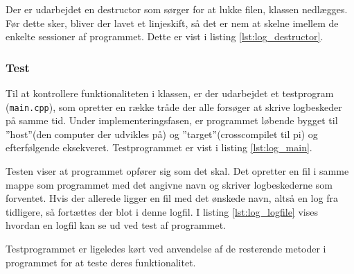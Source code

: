 

Der er udarbejdet en destructor som sørger for at lukke filen, klassen nedlægges. Før dette sker, bliver der lavet et linjeskift, så det er nem at skelne imellem de enkelte sessioner af programmet. Dette er vist i listing \ref{lst:log_destructor}.



\clearpage

\subsubsection{Test}
Til at kontrollere funktionaliteten i klassen, er der udarbejdet et testprogram (\texttt{main.cpp}), som opretter en række tråde der alle forsøger at skrive logbeskeder på samme tid. Under implementeringsfasen, er programmet løbende bygget til ''host''(den computer der udvikles på) og ''target''(crosscompilet til pi) og efterfølgende eksekveret. Testprogrammet er vist i listing \ref{lst:log_main}.



Testen viser at programmet opfører sig som det skal. Det opretter en fil i samme mappe som programmet med det angivne navn og skriver logbeskederne som forventet. Hvis der allerede ligger en fil med det ønskede navn, altså en log fra tidligere, så fortættes der blot i denne logfil. I listing \ref{lst:log_logfile} vises hvordan en logfil kan se ud ved test af programmet.



Testprogrammet er ligeledes kørt ved anvendelse af de resterende metoder i programmet for at teste deres funktionalitet.